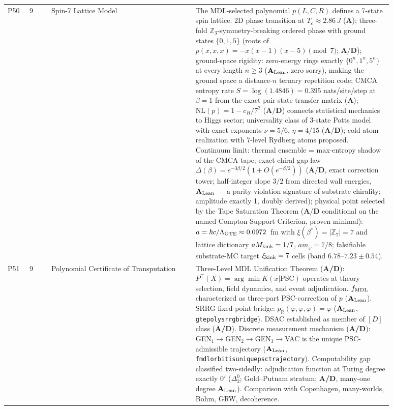 \documentclass[11pt]{article}
\newcommand{\lean}[1]{%
  \penalty-100
  \begingroup\def\_{{\textunderscore\allowbreak}}\texttt{#1}\endgroup}
\newcommand{\CatAL}{\ensuremath{\textbf{A}_{\rm Lean}}}
\newcommand{\CatAD}{\textbf{A/D}}
\newcommand{\CatA}{\textbf{A}}
\begin{document}
\begin{longtable}{@{}P{0.05\linewidth}P{0.05\linewidth}P{0.33\linewidth}P{0.45\linewidth}@{}}
P50 & 9 & Spin-7 Lattice Model & The MDL-selected polynomial $p(L,C,R)$ defines a 7-state spin lattice. 2D phase transition at $T_c \approx 2.86\,J$ ($\CatA$); three-fold $\mathbb{Z}_3$-symmetry-breaking ordered phase with ground states $\{0,1,5\}$ (roots of $p(x,x,x)=-x(x-1)(x-5)\pmod{7}$; $\CatAD$); ground-space rigidity: zero-energy rings exactly $\{0^n,1^n,5^n\}$ at every length $n\ge 3$ ($\CatAL$, zero sorry), making the ground space a distance-$n$ ternary repetition code; CMCA entropy rate $S=\log(1.4846)=0.395$ nats/site/step at $\beta=1$ from the exact pair-state transfer matrix ($\CatA$); $\mathrm{NL}(p)=1-c_H/7^2$ ($\CatAD$) connects statistical mechanics to Higgs sector; universality class of 3-state Potts model with exact exponents $\nu=5/6$, $\eta=4/15$ ($\CatAD$); cold-atom realization with 7-level Rydberg atoms proposed. Continuum limit: thermal ensemble = max-entropy shadow of the CMCA tape; exact chiral gap law $\Delta(\beta)=e^{-3\beta/2}(1+O(e^{-\beta/2}))$ ($\CatAD$, exact correction tower; half-integer slope $3/2$ from directed wall energies, $\CatAL$ --- a parity-violation signature of substrate chirality; amplitude exactly 1, doubly derived); physical point selected by the Tape Saturation Theorem ($\CatAD$ conditional on the named Compton-Support Criterion, proven minimal): $a=\hbar c/\Lambda_{\rm GTE}\approx 0.0972$~fm with $\xi(\beta^*)=|\mathbb{Z}_7|=7$ and lattice dictionary $aM_{\rm kink}=1/7$, $am_\varphi=7/8$; falsifiable substrate-MC target $\xi_{\rm kink}=7$ cells (band $6.78$--$7.23\pm0.54$). \\
P51 & 9 & Polynomial Certificate of Transputation & Three-Level MDL Unification Theorem (\CatAD{}): $P^\top(X)=\arg\min K(x|\text{PSC})$ operates at theory selection, field dynamics, and event adjudication. $f_{\rm MDL}$ characterized as three-part PSC-correction of $p$ (\CatAL). SRRG fixed-point bridge: $p_{\mathbb{R}}(\varphi,\varphi,\varphi)=\varphi$ (\CatAL, \lean{gte\_poly\_srrg\_bridge}). DSAC established as member of $[D]$ class (\CatAD). Discrete measurement mechanism (\CatAD): GEN$_1\to$GEN$_2\to$GEN$_3\to$VAC is the unique PSC-admissible trajectory (\CatAL, \lean{fmdl\_orbit\_is\_unique\_psc\_trajectory}). Computability gap classified two-sidedly: adjudication function at Turing degree exactly $0'$ ($\Delta_2^0$; Gold--Putnam stratum; \CatAD, many-one degree \CatAL). Comparison with Copenhagen, many-worlds, Bohm, GRW, decoherence. \\

\end{longtable}
\end{document}
